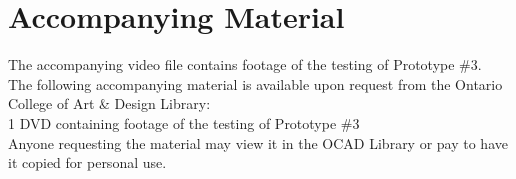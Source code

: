 \chapter{Accompanying Material}

The accompanying video file contains footage of the testing of Prototype \#3.\\

\noindent
The following accompanying material is available upon request from the Ontario College of Art \& Design Library:\\

1 DVD containing footage of the testing of Prototype \#3\\

\noindent
Anyone requesting the material may view it in the OCAD Library or pay to have it copied for personal use.
